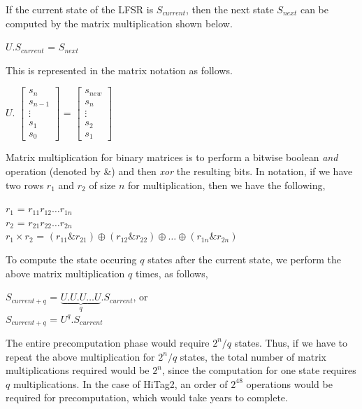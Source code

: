 If the current state of the LFSR is $S_{current}$, then the next state $S_{next}$ can be computed by the matrix multiplication shown below.

\begin{center}
\large{$U . S_{current}$ = $S_{next}$}\\
\end{center}

This is represented in the matrix notation as follows.

\begin{center}
\large{
$U.$
$\begin{bmatrix}
s_{n} \\
s_{n-1} \\
\vdots \\
s_{1} \\
s_{0}
\end{bmatrix}$ = 
$\begin{bmatrix}
s_{new} \\
s_{n} \\
\vdots \\
s_{2} \\
s_{1}
\end{bmatrix}$}
\end{center}

Matrix multiplication for binary matrices is to perform a bitwise boolean \emph{and} operation (denoted by \&) and then \emph{xor} the resulting bits. In notation, if we have two rows $r_1$ and $r_2$ of size $n$ for multiplication, then we have the following,

\begin{center}
\large{$r_1$ = $r_{11} r_{12} \ldots r_{1n}$}\\
\large{$r_2$ = $r_{21} r_{22} \ldots r_{2n}$}\\
\large{$r_1 \times r_2$ = $(r_{11} \& r_{21}) \oplus (r_{12} \& r_{22}) \oplus \ldots \oplus (r_{1n} \& r_{2n})$}
\end{center}

To compute the state occuring $q$ states after the current state, we perform the above matrix multiplication $q$ times, as follows,

\begin{center}
\large{$S_{current + q}$ = $\underbrace{U . U . U \dots U}_{q} . S_{current}$}, or\\
\large{$S_{current + q}$ = $U^q . S_{current}$}\\
\end{center}

The entire precomputation phase would require $2^n/q$ states. Thus, if we have to repeat the above multiplication for $2^n/q$ states, the total number of matrix multiplications required would be $2^n$, since the computation for one state requires $q$ multiplications. In the case of HiTag2, an order of $2^{48}$ operations would be required for precomputation, which would take years to complete.

